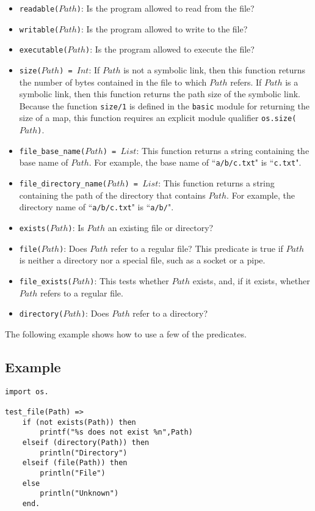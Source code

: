 \begin{itemize}
{}
\item \texttt{readable($Path$)}: Is the program allowed to read from the file?
\item \texttt{writable($Path$)}: Is the program allowed to write to the file?
\item \texttt{executable($Path$)}: Is the program allowed to execute the file?
\item \texttt{size($Path$) = $Int$}: If $Path$ is not a symbolic link, then this function returns the number of bytes contained in the file to which $Path$ refers.  If $Path$ is a symbolic link, then this function returns the path size of the symbolic link. Because the function {\tt size/1} is defined in the {\tt basic} module for returning the size of a map, this function requires an explicit module qualifier {\tt os.size($Path$)}.

\item \texttt{file\_base\_name($Path$) = $List$}: This function returns a string containing the base name of $Path$.  For example, the base name of ``\texttt{a/b/c.txt}" is ``\texttt{c.txt}".
\item \texttt{file\_directory\_name($Path$) = $List$}: This function returns a string containing the path of the directory that contains $Path$.  For example, the directory name of ``\texttt{a/b/c.txt}" is ``\texttt{a/b/}".
\item \texttt{exists($Path$)}: Is $Path$ an existing file or directory?
\item \texttt{file($Path$)}: Does $Path$ refer to a regular file?  This predicate is true if $Path$ is neither a directory nor a special file, such as a socket or a pipe.
\item \texttt{file\_exists($Path$)}:  This tests whether $Path$ exists, and, if it exists, whether $Path$ refers to a regular file.
\item \texttt{directory($Path$)}: Does $Path$ refer to a directory?
\end{itemize}

The following example shows how to use a few of the predicates.

\subsection*{Example}
\begin{verbatim}
import os.

test_file(Path) =>
    if (not exists(Path)) then
        printf("%s does not exist %n",Path)
    elseif (directory(Path)) then
        println("Directory")
    elseif (file(Path)) then
        println("File")
    else
        println("Unknown")
    end.
\end{verbatim}

